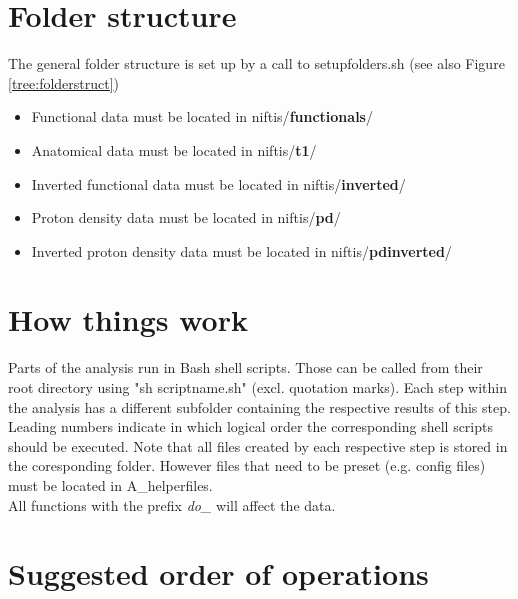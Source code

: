 \documentclass[12pt,a4paper]{scrartcl}
\begin{document}
\section{Folder structure}
The general folder structure is set up by a call to setupfolders.sh (see also Figure \ref{tree:folderstruct})
\begin{itemize}
\item Functional data must be located in niftis/\textbf{functionals}/
\item Anatomical data must be located in niftis/\textbf{t1}/
\item Inverted functional data must be located in niftis/\textbf{inverted}/
\item Proton density data must be located in niftis/\textbf{pd}/
\item Inverted proton density data must be located in niftis/\textbf{pdinverted}/
\end{itemize}

\section{How things work}
Parts of the analysis run in Bash shell scripts. Those can be called from their root directory using "sh scriptname.sh" (excl. quotation marks). Each step within the analysis has a different subfolder containing the respective results of this step. Leading numbers indicate in which logical order the corresponding shell scripts should be executed. Note that all files created by each respective step is stored in the coresponding folder. However files that need to be preset (e.g. config files) must be located in A\_helperfiles.\\

\noindent All functions with the prefix \textit{do\_} will affect the data.

\section{Suggested order of operations}
\end{document}
